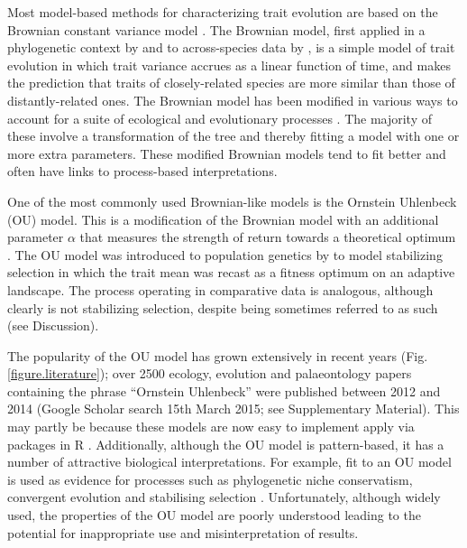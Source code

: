 \documentclass[a4paper,12pt]{article}
\begin{document}
  Most model-based methods for characterizing trait evolution are based on the Brownian constant variance model \citep[for exceptions see][]{price1997correlated,harvey2000comparative,freckleton2006detecting}. 
  The Brownian model, first applied in a phylogenetic context by \citet{cavalli1967} and to across-species data by \citet{felsenstein1973maximum}, is a simple model of trait evolution in which trait variance accrues as a linear function of time, and makes the prediction that traits of closely-related species are more similar than those of distantly-related ones. 
  The Brownian model has been modified in various ways to account for a suite of ecological and evolutionary processes \citep[e.g.,][]{grafen1989phylogenetic,hansen1997stabilizing,Pagel:1997aa,Pagel:1999aa}. 
  The majority of these involve a transformation of the tree and thereby fitting a model with one or more extra parameters. 
  These modified Brownian models tend to fit better and often have links to process-based interpretations. 

  One of the most commonly used Brownian-like models is the Ornstein Uhlenbeck (OU) model. 
  This is a modification of the Brownian model with an additional parameter $\alpha$ that measures the strength of return towards a theoretical optimum \citep{hansen1997stabilizing}. 
  The OU model was introduced to population genetics by \cite{Lande:1976aa} to model stabilizing selection in which the trait mean was recast as a fitness optimum on an adaptive landscape. 
  The process operating in comparative data is analogous, although clearly is not stabilizing selection, despite being sometimes referred to as such (see Discussion).

  The popularity of the OU model has grown extensively in recent years (Fig. \ref{figure.literature}); over 2500 ecology, evolution and palaeontology papers containing the phrase ``Ornstein Uhlenbeck'' were published between 2012 and 2014 (Google Scholar search 15th March 2015; see Supplementary Material). %
  This may partly be because these models are now easy to implement apply via packages in R \citep[e.g. ouch, GEIGER and OUwie;][]{Butler:2004aa,Harmon:2008aa,beaulieu2012ouwie}. 
  Additionally, although the OU model is pattern-based, it has a number of attractive biological interpretations. 
  For example, fit to an OU model is used as evidence for processes such as phylogenetic niche conservatism, convergent evolution and stabilising selection \citep[e.g.,][]{Wiens:2010aa,christin2013anatomical,ingram2013surface}. 
  Unfortunately, although widely used, the properties of the OU model are poorly understood leading to the potential for inappropriate use and misinterpretation of results. 
 
\end{document}
